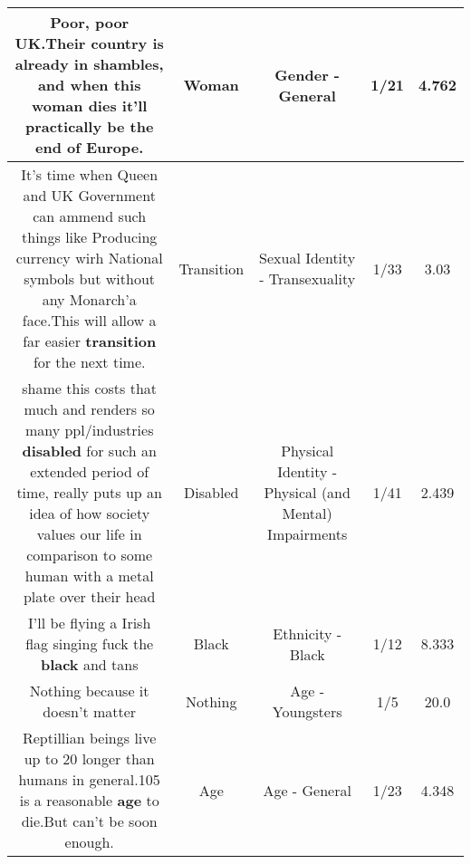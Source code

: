 \documentclass[11pt]{article}
\newlength\mylength
\begin{document}
\begin{center}
\begin{longtable}{|C{.65\mylength}|C{.30\mylength}|C{.12\mylength}|C{.12\mylength}|C{.12\mylength}|}
  \small Poor, poor UK.Their country is already in shambles, and when this \textbf{woman} dies it'll practically be the end of Europe.\normalsize   & Woman & Gender - General & 1/21 & 4.762 \\  \hline
  \small It's time when Queen and UK Government can ammend such things like Producing currency wirh National symbols but without any Monarch'a face.This will allow a far easier \textbf{transition} for the next time.\normalsize   & Transition & Sexual Identity - Transexuality & 1/33 & 3.03 \\  \hline
  \small shame this costs that much and renders so many ppl/industries \textbf{disabled} for such an extended period of time, really puts up an idea of how society values our life in comparison to some human with a metal plate over their head\normalsize   & Disabled & Physical Identity - Physical (and Mental) Impairments & 1/41 & 2.439 \\  \hline
  \small I'll be flying a Irish flag singing fuck the \textbf{black} and tans\normalsize   & Black & Ethnicity - Black & 1/12 & 8.333 \\  \hline
  \small Nothing because it doesn't matter\normalsize   & Nothing & Age - Youngsters & 1/5 & 20.0 \\  \hline
  \small Reptillian beings live up to 20 longer than humans in general.105 is a reasonable \textbf{age} to die.But can't be soon enough.\normalsize   & Age & Age - General & 1/23 & 4.348 \\  \hline

\end{longtable}
\end{center}
\end{document}
